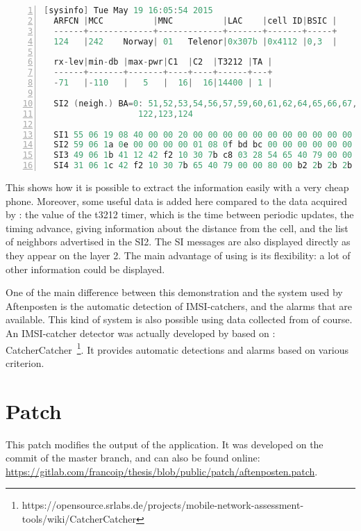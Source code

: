       \begin{lstlisting}[language=C, numbers=left,
        basicstyle=\footnotesize,
      breaklines=true, frame=single, keepspaces=true]
  [sysinfo] Tue May 19 16:05:54 2015
  ARFCN |MCC          |MNC          |LAC    |cell ID|BSIC |
  ------+-------------+-------------+-------+-------+-----+
  124   |242    Norway| 01   Telenor|0x307b |0x4112 |0,3  |

  rx-lev|min-db |max-pwr|C1  |C2  |T3212 |TA |
  ------+-------+-------+----+----+------+---+
  -71   |-110   |   5   |  16|  16|14400 | 1 |

  SI2 (neigh.) BA=0: 51,52,53,54,56,57,59,60,61,62,64,65,66,67,68,76,81,
                   122,123,124

  SI1 55 06 19 08 40 00 00 20 00 00 00 00 00 00 00 00 00 00 00 79 00 00 2b
  SI2 59 06 1a 0e 00 00 00 00 01 08 0f bd bc 00 00 00 00 00 00 ff 79 00 00
  SI3 49 06 1b 41 12 42 f2 10 30 7b c8 03 28 54 65 40 79 00 00 80 00 a0 43
  SI4 31 06 1c 42 f2 10 30 7b 65 40 79 00 00 80 00 b2 2b 2b 2b 2b 2b 2b 2b
      \end{lstlisting}

    This shows how it is possible to extract the information easily with
    a very cheap phone. Moreover, some useful data is added here
    compared to the data acquired by : the value of
    the t3212 timer, which is the time between periodic updates, the
    timing advance, giving information about the distance from the cell, and
    the list of neighbors advertised in the SI2. The SI messages are
    also displayed directly as they appear on the layer 2. The main
    advantage of using  is its flexibility: a lot of
    other information could be displayed.

    One of the main difference between this demonstration and the system
    used by Aftenposten is the automatic detection of IMSI-catchers, and
    the alarms that are available. This kind of system is also possible
    using data collected from  of course. An
    IMSI-catcher detector was actually developed by  based
    on :
    CatcherCatcher~\footnote{https://opensource.srlabs.de/projects/mobile-network-assessment-tools/wiki/CatcherCatcher}.
    It provides automatic detections and alarms based on various
    criterion.

\newpage

    \section{Patch}

      This patch modifies the output of the 
      application. It was developed on the
       commit of the
      master branch, and can also be found online:
      \url{https://gitlab.com/francoip/thesis/blob/public/patch/aftenposten.patch}. \\


